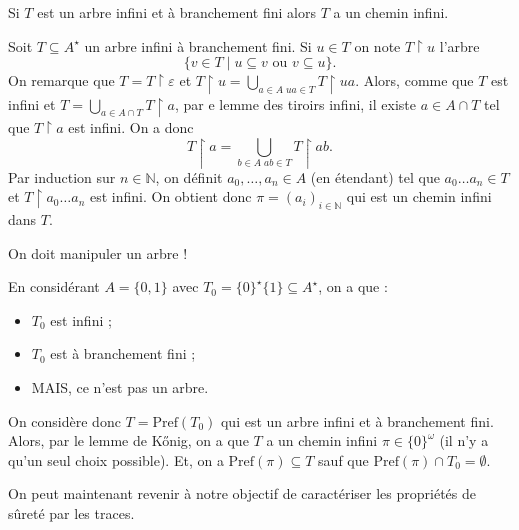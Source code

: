 \documentclass[./main]{subfiles}
\begin{document}
  \begin{lem}
    Si $T$ est un arbre infini et à branchement fini alors $T$ a un chemin infini.
  \end{lem}
  \begin{prv}
    Soit $T \subseteq A^\star$ un arbre infini à branchement fini.
    Si $u \in T$ on note $T \upharpoonright u$ l'arbre 
    \[
    \{v \in T  \mid u \subseteq v \text{ ou } v \subseteq u \} 
    .\]
    On remarque que $T = T \upharpoonright \varepsilon$ et  $T \upharpoonright u = \bigcup_{a \in A \; ua \in T} T \upharpoonright ua$.
    Alors, comme que $T$ est infini et $T = \bigcup_{a \in A \cap T} T \upharpoonright a$, par e lemme des tiroirs infini, il existe $a \in A \cap T$ tel que $T \upharpoonright a$ est infini.
    On a donc 
     \[
    T \upharpoonright a = \bigcup_{b \in A \; ab \in T} T \upharpoonright ab
    .\]
    Par induction sur $n \in \mathds{N}$, on définit $a_0,\ldots,a_n \in A$ (en étendant) tel que $a_0\ldots a_n \in T$ et $T \upharpoonright a_0 \ldots a_n$ est infini.
    On obtient donc $\pi = (a_i)_{i \in \mathds{N}}$ qui est un chemin infini dans $T$.
  \end{prv}

  \begin{rmk}[Attention !]
    On doit manipuler un arbre !

    En considérant $A = \{0,1\}$ avec $T_0 = \{0\}^\star \{1\} \subseteq A^\star$, on a que :
    \begin{itemize}
      \item $T_0$ est infini ;
      \item $T_0$ est à branchement fini ;
      \item MAIS, ce n'est pas un arbre.
    \end{itemize}
    On considère donc $T = \mathrm{Pref}(T_0)$ qui est un arbre infini et à branchement fini.
    Alors, par le lemme de Kőnig, on a que $T$ a un chemin infini $\pi \in \{0\}^\omega$ (il n'y a qu'un seul choix possible).
    Et, on a $\mathrm{Pref}(\pi) \subseteq T$ sauf que $\mathrm{Pref}(\pi) \cap T_0 = \emptyset$.
  \end{rmk}

  On peut maintenant revenir à notre objectif de caractériser les propriétés de sûreté par les traces.
\end{document}
